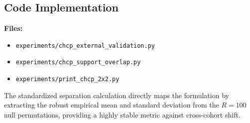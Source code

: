 \documentclass{article}
\begin{document}
\subsection{Code Implementation}
\textbf{Files:}
\begin{itemize}
    \item \texttt{experiments/chcp\_external\_validation.py}
    \item \texttt{experiments/chcp\_support\_overlap.py}
    \item \texttt{experiments/print\_chcp\_2x2.py}
\end{itemize}
The standardized separation calculation directly maps the formulation by extracting the robust empirical mean and standard deviation from the $R=100$ null permutations, providing a highly stable metric against cross-cohort shift.
\end{document}
